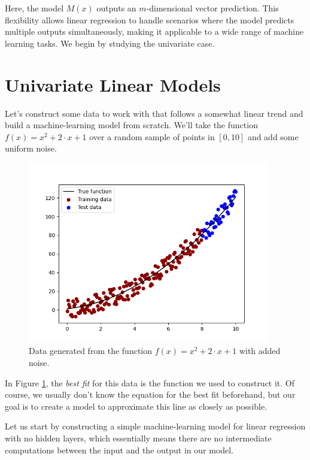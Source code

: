 Here, the model $M(x)$ outputs an $m$-dimensional vector prediction. This flexibility allows linear regression to handle scenarios where the model predicts multiple outputs simultaneously, making it applicable to a wide range of machine learning tasks. We begin by studying the univariate case.

\section{Univariate Linear Models}
\label{sec:2}
Let's construct some data to work with that follows a somewhat linear trend and build a machine-learning model from scratch. We'll take the function $f(x)=x^2+2\cdot x+1$ over a random sample of points in $[0,10]$ and add some uniform noise.



\begin{figure}[H]
\centering
\includegraphics[width=300pt]{Regression/code/fig1.png}
\caption{Data generated from the function $f(x)=x^2+2\cdot x+1$ with added noise.}
\label{fig:linear1}
\end{figure}

In Figure \ref{fig:linear1}, the \textit{best fit} for this data is the function we used to construct it. Of course, we usually don't know the equation for the best fit beforehand, but our goal is to create a model to approximate this line as closely as possible. 

Let us start by constructing a simple machine-learning model for linear regression with no hidden layers, which essentially means there are no intermediate computations between the input and the output in our model.


